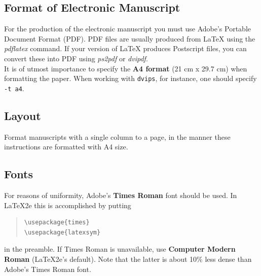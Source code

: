 \documentclass[11pt]{article}
\begin{document}
\subsection{Format of Electronic Manuscript}
\label{sect:pdf}

For the production of the electronic manuscript you must use Adobe's
Portable Document Format (PDF). PDF files are usually produced from
\LaTeX{} using the \textit{pdflatex} command. If your version of
\LaTeX{} produces Postscript files, you can convert these into PDF
using \textit{ps2pdf} or \textit{dvipdf}.\\

It is of utmost importance to specify the \textbf{A4 format} (21 cm
x 29.7 cm) when formatting the paper. When working with
{\tt dvips}, for instance, one should specify {\tt -t a4}.\\


\subsection{Layout}
\label{ssec:layout}

Format manuscripts with a single column to a page, in the manner these
instructions are formatted with A4 size.



\subsection{Fonts}
For reasons of uniformity, Adobe's {\bf Times Roman} font should be
used. In \LaTeX2e{} this is accomplished by putting 

\begin{quote}
\begin{verbatim}
\usepackage{times}
\usepackage{latexsym}
\end{verbatim}
\end{quote}
in the preamble. If Times Roman is unavailable, use {\bf Computer
  Modern Roman} (\LaTeX2e{}'s default).  Note that the latter is about
  10\% less dense than Adobe's Times Roman font.
\end{document}
